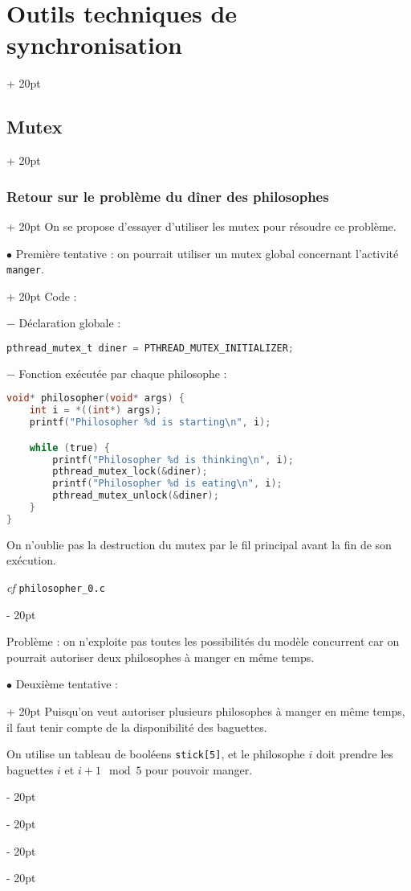 \documentclass[a4paper, 12pt, twoside]{article}
\newcommand{\ind}[1][20pt]{\advance\leftskip + #1}
\newcommand{\deind}[1][20pt]{\advance\leftskip - #1}
\newenvironment{indt}[2][20pt]{#2 \par \ind[#1]}{\par \deind} %
\begin{document}
\begin{indt}{\section{Outils techniques de synchronisation}}
\begin{indt}{\subsection{Mutex}}
\begin{indt}{\subsubsection{Retour sur le problème du dîner des philosophes}}
                On se propose d'essayer d'utiliser les mutex pour résoudre ce problème.

                \begin{indt}{$\bullet$  Première tentative : on pourrait utiliser un mutex global concernant l'activité \texttt{manger}.}
                    Code :

                    $-$ Déclaration globale :

                    \begin{lstlisting}[language=C, xleftmargin=100pt]
pthread_mutex_t diner = PTHREAD_MUTEX_INITIALIZER;\end{lstlisting}

                    $-$ Fonction exécutée par chaque philosophe :

                    \newpage

                    \begin{lstlisting}[language=C, xleftmargin=100pt]
void* philosopher(void* args) {
    int i = *((int*) args);
    printf("Philosopher %d is starting\n", i);

    while (true) {
        printf("Philosopher %d is thinking\n", i);
        pthread_mutex_lock(&diner);
        printf("Philosopher %d is eating\n", i);
        pthread_mutex_unlock(&diner);
    }
}\end{lstlisting}

                    On n'oublie pas la destruction du mutex par le fil principal avant la fin de son exécution.

                    \textit{cf} \texttt{philosopher\_0.c}
                \end{indt}

                \vspace{12pt}
                
                Problème : on n'exploite pas toutes les possibilités du modèle concurrent car on pourrait autoriser deux philosophes à manger en même temps.

                \vspace{12pt}
                
                \begin{indt}{$\bullet$ Deuxième tentative :}
                    Puisqu'on veut autoriser plusieurs philosophes à manger en même temps, il faut tenir compte de la disponibilité des baguettes.

                    On utilise un tableau de booléens \texttt{stick[5]}, et le philosophe $i$ doit prendre les baguettes $i$ et $i + 1 \mod 5$ pour pouvoir manger.


\end{indt}
\end{indt}
\end{indt}
\end{indt}
\end{document}
